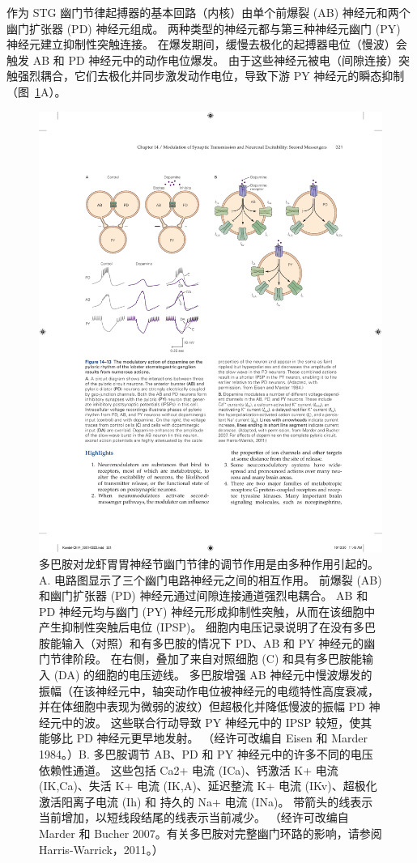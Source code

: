 作为 STG 幽门节律起搏器的基本回路（内核）由单个前爆裂 (AB) 神经元和两个幽门扩张器 (PD) 神经元组成。
两种类型的神经元都与第三种神经元幽门 (PY) 神经元建立抑制性突触连接。
在爆发期间，缓慢去极化的起搏器电位（慢波）会触发 AB 和 PD 神经元中的动作电位爆发。
由于这些神经元被电（间隙连接）突触强烈耦合，它们去极化并同步激发动作电位，导致下游 PY 神经元的瞬态抑制（图~\ref{fig:14_13}A）。


\begin{figure}[htbp]
	\centering
	\includegraphics[width=0.95\linewidth]{chap14/fig_14_13}
	\caption{多巴胺对龙虾胃胃神经节幽门节律的调节作用是由多种作用引起的。 A. 电路图显示了三个幽门电路神经元之间的相互作用。 前爆裂 (AB) 和幽门扩张器 (PD) 神经元通过间隙连接通道强烈电耦合。 AB 和 PD 神经元均与幽门 (PY) 神经元形成抑制性突触，从而在该细胞中产生抑制性突触后电位 (IPSP)。 细胞内电压记录说明了在没有多巴胺能输入（对照）和有多巴胺的情况下 PD、AB 和 PY 神经元的幽门节律阶段。 在右侧，叠加了来自对照细胞 (C) 和具有多巴胺能输入 (DA) 的细胞的电压迹线。 多巴胺增强 AB 神经元中慢波爆发的振幅（在该神经元中，轴突动作电位被神经元的电缆特性高度衰减，并在体细胞中表现为微弱的波纹）但超极化并降低慢波的振幅 PD 神经元中的波。 这些联合行动导致 PY 神经元中的 IPSP 较短，使其能够比 PD 神经元更早地发射。 （经许可改编自 Eisen 和 Marder 1984。）B. 多巴胺调节 AB、PD 和 PY 神经元中的许多不同的电压依赖性通道。 这些包括 Ca2+ 电流 (ICa)、钙激活 K+ 电流 (IK,Ca)、失活 K+ 电流 (IK,A)、延迟整流 K+ 电流 (IKv)、超极化激活阳离子电流 (Ih) 和 持久的 Na+ 电流 (INa)。 带箭头的线表示当前增加，以短线段结尾的线表示当前减少。 （经许可改编自 Marder 和 Bucher 2007。有关多巴胺对完整幽门环路的影响，请参阅 Harris-Warrick，2011。）}
	\label{fig:14_13}
\end{figure}


